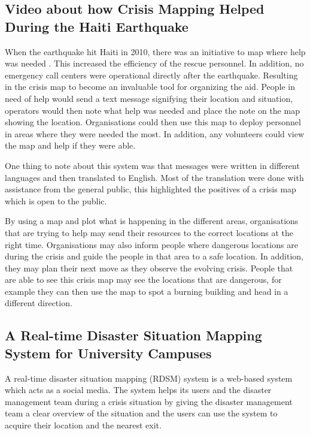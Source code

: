 \subsection{Video about how Crisis Mapping Helped During the Haiti Earthquake}

When the earthquake hit Haiti in 2010, there was an initiative to map where help was needed \cite{usha}. This increased the efficiency of the rescue personnel. In addition, no emergency call centers were operational directly after the earthquake. Resulting in the crisis map to become an invaluable tool for organizing the aid. People in need of help would send a text message signifying their location and situation, operators would then note what help was needed and place the note on the map showing the location. Organisations could then use this map to deploy personnel in areas where they were needed the most. In addition, any volunteers could view the map and help if they were able.

One thing to note about this system was that messages were written in different languages and then translated to English. Most of the translation were done with assistance from the general public, this highlighted the positives of a crisis map which is open to the public.

By using a map and plot what is happening in the different areas, organisations that are trying to help may send their resources to the correct locations at the right time. Organisations may also inform people where dangerous locations are during the crisis and guide the people in that area to a safe location. In addition, they may plan their next move as they observe the evolving crisis. People that are able to see this crisis map may see the locations that are dangerous, for example they can then use the map to spot a burning building and head in a different direction. 

\subsection{A Real-time Disaster Situation Mapping System for University Campuses}

A real-time disaster situation mapping (RDSM) system is a web-based system which acts as a social media. The system helps its users and the disaster management team during a crisis situation by giving the disaster management team a clear overview of the situation and the users can use the system to acquire their location and the nearest exit.

